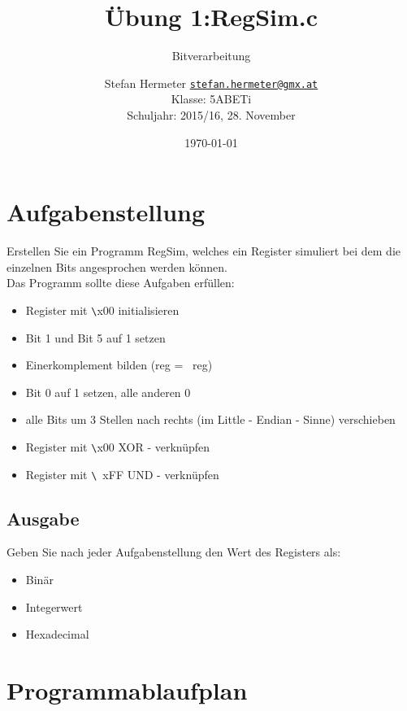 \documentclass{scrartcl}
\newcommand{\mytitle}{Übung 1}
\begin{document}
\title{\mytitle:RegSim.c}
\subtitle{Bitverarbeitung}
\date{\today}
\author{Stefan Hermeter \texttt{\href{mailto:stefan.hermeter@gmx.at}{stefan.hermeter@gmx.at}}\\
  Klasse: 5ABETi\\
  Schuljahr: 2015/16, 28. November}
\maketitle
{}
\newpage
\tableofcontents
\listoffigures
\listoftables
\newpage
{}
\section{Aufgabenstellung}
Erstellen Sie ein Programm RegSim, welches ein Register simuliert bei dem die einzelnen Bits angesprochen werden können.\\
Das Programm sollte diese Aufgaben erfüllen:

\begin{itemize}
\item Register mit  \verb|\|x00 initialisieren
\item Bit 1 und Bit 5 auf 1 setzen
\item Einerkomplement bilden (reg = ~reg)
\item Bit 0 auf 1 setzen, alle anderen 0
\item alle Bits um 3 Stellen nach rechts (im Little - Endian - Sinne) verschieben
\item Register mit \verb|\|x00 XOR - verknüpfen
\item Register mit  \verb|\|\ xFF UND - verknüpfen
\end{itemize}
  
\subsection{Ausgabe}
Geben Sie nach jeder Aufgabenstellung den Wert des Registers als:

\begin{itemize}
\item[1)] Binär
\item[2)] Integerwert
\item[3)] Hexadecimal
\end {itemize}

\section{Programmablaufplan}
\end{document}
